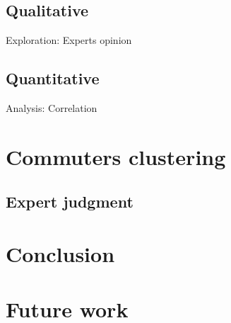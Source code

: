 \documentclass{article}
\begin{document}
\subsection{Qualitative}
Exploration: Experts opinion

\subsection{Quantitative}
Analysis: Correlation

\section{Commuters clustering}
\subsection{Expert judgment}

\section{Conclusion}

\section{Future work}

{}

\end{document}
